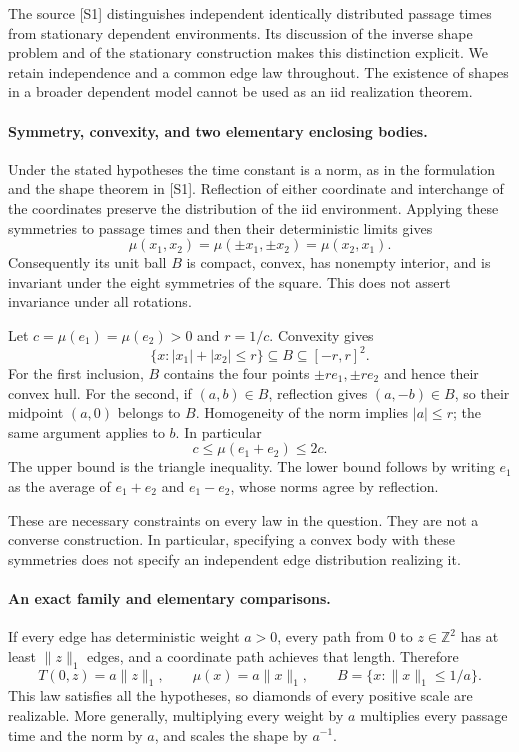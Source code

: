\documentclass[11pt]{article}
\begin{document}
The source [S1] distinguishes independent identically distributed passage times from stationary dependent environments. Its discussion of the inverse shape problem and of the stationary construction makes this distinction explicit. We retain independence and a common edge law throughout. The existence of shapes in a broader dependent model cannot be used as an iid realization theorem.

\paragraph{Symmetry, convexity, and two elementary enclosing bodies.}
Under the stated hypotheses the time constant is a norm, as in the formulation and the shape theorem in [S1]. Reflection of either coordinate and interchange of the coordinates preserve the distribution of the iid environment. Applying these symmetries to passage times and then their deterministic limits gives
\[
 \mu(x_1,x_2)=\mu(\pm x_1,\pm x_2)=\mu(x_2,x_1).
 \tag{422.1}
\]
Consequently its unit ball $B$ is compact, convex, has nonempty interior, and is invariant under the eight symmetries of the square. This does not assert invariance under all rotations.

Let $c=\mu(e_1)=\mu(e_2)>0$ and $r=1/c$. Convexity gives
\[
 \{x:|x_1|+|x_2|\le r\}\subseteq B\subseteq[-r,r]^2.
 \tag{422.2}
\]
For the first inclusion, $B$ contains the four points $\pm re_1,\pm re_2$ and hence their convex hull. For the second, if $(a,b)\in B$, reflection gives $(a,-b)\in B$, so their midpoint $(a,0)$ belongs to $B$. Homogeneity of the norm implies $|a|\le r$; the same argument applies to $b$. In particular
\[
 c\le\mu(e_1+e_2)\le2c. \tag{422.3}
\]
The upper bound is the triangle inequality. The lower bound follows by writing $e_1$ as the average of $e_1+e_2$ and $e_1-e_2$, whose norms agree by reflection.

These are necessary constraints on every law in the question. They are not a converse construction. In particular, specifying a convex body with these symmetries does not specify an independent edge distribution realizing it.

\paragraph{An exact family and elementary comparisons.}
If every edge has deterministic weight $a>0$, every path from $0$ to $z\in\mathbb Z^2$ has at least $\|z\|_1$ edges, and a coordinate path achieves that length. Therefore
\[
 T(0,z)=a\|z\|_1,\qquad
 \mu(x)=a\|x\|_1,\qquad
 B=\{x:\|x\|_1\le1/a\}. \tag{422.4}
\]
This law satisfies all the hypotheses, so diamonds of every positive scale are realizable. More generally, multiplying every weight by $a$ multiplies every passage time and the norm by $a$, and scales the shape by $a^{-1}$.
\end{document}
